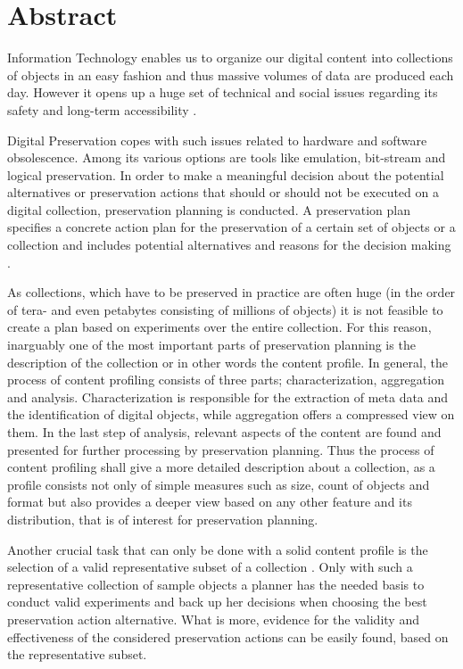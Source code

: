 \chapter*{Abstract}
Information Technology enables us to organize our digital content into collections of objects in an easy fashion and thus massive volumes of data are produced each day.
However it opens up a huge set of technical and social issues regarding its safety and long-term accessibility \cite{Lorie:2001:LTP:379437.379726}.

Digital Preservation copes with such issues related to hardware and software obsolescence. Among its various
options are tools like emulation, bit-stream and logical preservation. In order to make a meaningful decision
about the potential alternatives or preservation actions that should or should not be executed on a
digital collection, preservation planning is conducted. A preservation plan specifies a concrete action plan for the preservation
of a certain set of objects or a collection and includes potential alternatives and reasons for the decision making  \cite{Becker:2009fk}. 

As collections, which have to be preserved in practice are often huge (in the order of tera- and even petabytes consisting of millions of objects) it is not feasible to create a plan based on experiments over the entire collection. For this reason, inarguably one of the most important parts of preservation planning is the description of the collection or in other words the content profile. In general, the process of content profiling consists of three parts; characterization, aggregation and analysis. Characterization is responsible for the extraction of meta data and the identification of digital objects, while aggregation offers a compressed view on them. In the last step of analysis, relevant aspects of the content are found and presented for further processing by preservation planning. Thus the process of content profiling shall give a more detailed description about a collection, as a profile consists not only of simple measures such as size, count of objects and format but also provides a deeper view based on any other feature and its distribution, that is of interest for preservation planning.

Another crucial task that can only be done with a solid content profile is the selection of a valid representative subset of a collection \cite{Becker:2011:PDT:1998076.1998089, Pan05findingrepresentative}. Only with such a representative collection of sample objects a planner 
has the needed basis to conduct valid experiments and back up her decisions when choosing the best
preservation action alternative. What is more, evidence for the validity and effectiveness of the considered preservation actions can be easily found, based on the representative subset.

